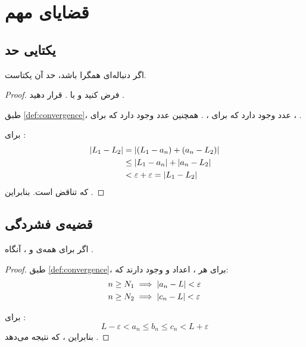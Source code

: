 
\section{قضایای مهم}
\label{sec:math-book-theorems}

\subsection{یکتایی حد}
\label{sec:math-book-unique-limit}

\begin{theorem}[یکتایی حد]
    اگر دنباله‌ای همگرا باشد، حد آن یکتاست.
    \label{thm:unique-limit}
\end{theorem}

\begin{proof}
    فرض کنید  و
     با
    . قرار دهید
    .

    طبق \cref{def:convergence}، عدد 
    وجود دارد که برای ،
    .
    همچنین عدد  وجود دارد که برای
    ،
    .

    برای :
    \begin{align*}
        \lvert L_1 - L_2\rvert
        &= \lvert(L_1 - a_n) + (a_n - L_2)\rvert \\
        &\leq \lvert L_1 - a_n\rvert + \lvert a_n - L_2\rvert \\
        &< \varepsilon + \varepsilon = \lvert L_1 - L_2\rvert
    \end{align*}
    که تناقض است. بنابراین .
\end{proof}

\subsection{قضیه‌ی فشردگی}
\label{sec:math-book-squeeze}

\begin{theorem}
    اگر  برای
    همه‌ی  و
    ، آنگاه
    .
    \label{thm:squeeze}
\end{theorem}

\begin{proof}
    طبق \cref{def:convergence}، برای هر
    ، اعداد 
    و  وجود دارند که:
    \begin{align*}
        n \geq N_1 &\implies \lvert a_n - L\rvert < \varepsilon \\
        n \geq N_2 &\implies \lvert c_n - L\rvert < \varepsilon
    \end{align*}

    برای :
    \[
        L - \varepsilon < a_n \leq b_n \leq c_n < L + \varepsilon
    \]
    بنابراین ،
    که نتیجه می‌دهد .
\end{proof}

